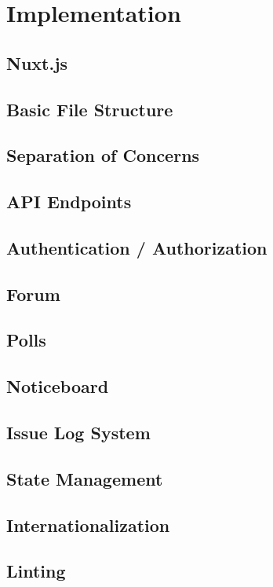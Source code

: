 \chapter[Implementation]{Implementation}

\section{Nuxt.js}

\section{Basic File Structure}

\section{Separation of Concerns}

\section{API Endpoints}

\section{Authentication / Authorization}

\section{Forum}

\section{Polls}

\section{Noticeboard}

\section{Issue Log System}

\section{State Management}

\section{Internationalization}

\section{Linting}